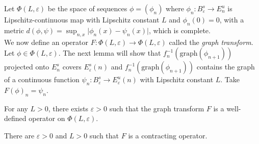 Let $\Phi(L, \varepsilon)$ be the space of sequences $\phi = (\phi_n)$ where $\phi_n:B^s_{\varepsilon} \to E^u_n$ is Lipschitz-continuous map with Lipschitz constant $L$ and $\phi_n(0) = 0$, with a metric $d(\phi,\psi)=\sup_{n,x} \vert \phi_n(x) - \psi_n(x) \vert$, which is complete. \\
\indent We now define an operator $F: \Phi(L,\varepsilon) \to \Phi(L, \varepsilon)$ called the \textit{graph transform}. Let $\phi \in \Phi(L,\varepsilon)$. The next lemma will show that $f^{-1}_n (\mathrm{graph}(\phi_{n+1}))$ projected onto $E^s_n$ covers $E^s_{\varepsilon}(n)$ and $f^{-1}_n(\mathrm{graph}(\phi_{n+1}))$ contains the graph of a continuous function $\psi_n: B^s_{\varepsilon} \to E^u_{\varepsilon}(n)$ with Lipschitz constant $L$. Take $F(\phi)_n = \psi_n$.

\begin{lem}
For any $L>0$, there exists $\varepsilon > 0$ such that the graph transform $F$ is a well-defined operator on $\Phi(L,\varepsilon)$.
\end{lem}

\begin{lem}
There are $\varepsilon >0$ and $L > 0$ such that $F$ is a contracting operator.
\end{lem}

